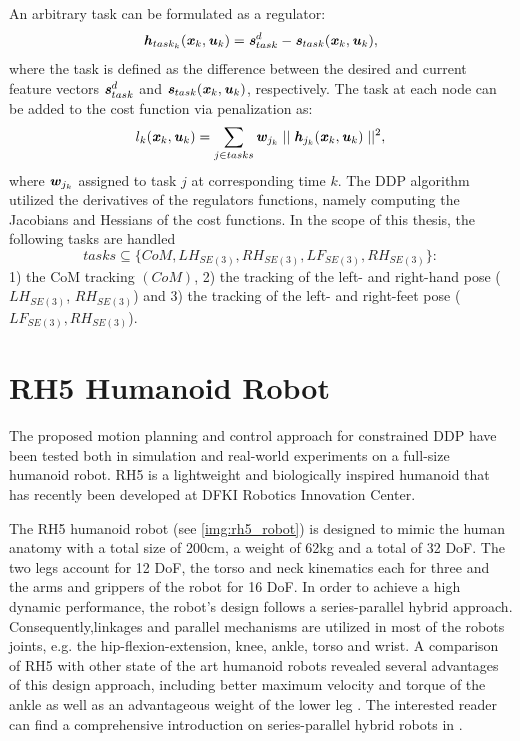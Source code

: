 An arbitrary task can be formulated as a regulator: 
\begin{equation*} 
\bm{\mathit{h}}_{task_k}(\bm{\mathit{x}}_k,\bm{\mathit{u}}_k)=\bm{\mathit{s}}_{task}^d-\bm{\mathit{s}}_{task}(\bm{\mathit{x}}_k,\bm{\mathit{u}}_k),
\end{equation*}   
where the task is defined as the difference between the desired and current feature vectors $\bm{\mathit{s}}_{task}^d$ and $\bm{\mathit{s}}_{task}(\bm{\mathit{x}}_k,\bm{\mathit{u}}_k)$, respectively. The task at each node can be added to the cost function via penalization as: 
\begin{equation*} 
l_k(\bm{\mathit{x}}_k,\bm{\mathit{u}}_k)=\sum_{j\in tasks}\bm{\mathit{w}}_{j_k}\mid\mid\bm{\mathit{h}}_{j_k}(\bm{\mathit{x}}_k,\bm{\mathit{u}}_k)\mid\mid^2,
\end{equation*}  
where $\bm{\mathit{w}}_{j_k}$ assigned to task $j$ at corresponding time $k$. The \gls{DDP} algorithm utilized the derivatives of the regulators functions, namely computing the Jacobians and Hessians of the cost functions. 
In the scope of this thesis, the following tasks are handled
\begin{equation}
tasks \subseteq \{CoM, LH_{SE(3)}, RH_{SE(3)}, LF_{SE(3)}, RH_{SE(3)}\}:
\end{equation}
1) the \gls{CoM} tracking $(CoM)$, 2) the tracking of the left- and right-hand pose ($LH_{SE(3)}$, $RH_{SE(3)}$) and 3) the tracking of the left- and right-feet pose ($LF_{SE(3)}, RH_{SE(3)}$).


\section{RH5 Humanoid Robot}
The proposed motion planning and control approach for constrained \gls{DDP} have been tested both in simulation and real-world experiments on a full-size humanoid robot. RH5 is a lightweight and biologically inspired humanoid that has recently been developed at DFKI Robotics Innovation Center\cite{peters2017konstruktion}.

The RH5 humanoid robot (see \cref{img:rh5_robot}) is designed to mimic the human anatomy with a total size of 200cm, a weight of 62kg and a total of 32 \gls{DoF}. The two legs account for 12 \gls{DoF}, the torso and neck kinematics each for three and the arms and grippers of the robot for 16 \gls{DoF}. In order to achieve a high dynamic performance, the robot's design follows a series-parallel hybrid approach. Consequently,linkages and parallel mechanisms are utilized in most of the robots joints, e.g. the hip-flexion-extension, knee, ankle, torso and wrist. A comparison of RH5 with other state of the art humanoid robots revealed several advantages of this design approach, including better maximum velocity and torque of the ankle as well as an advantageous weight of the lower leg \cite{kumar2020survey}. The interested reader can find a comprehensive introduction on series-parallel hybrid robots in \cite[Ch.2]{kumar2019modular}. 

